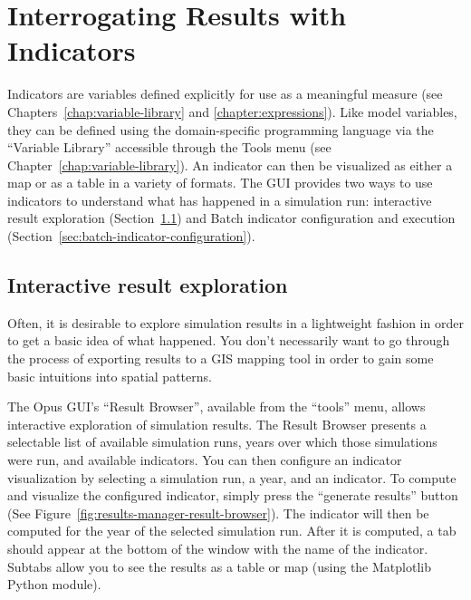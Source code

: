 \section{Interrogating Results with Indicators}
\label{sec:interrogating-results-with-indicators}

Indicators are variables defined explicitly for use as a meaningful
measure (see Chapters~\ref{chap:variable-library} and 
\ref{chapter:expressions}). Like model variables,
they can be defined using the domain-specific programming language via
the ``Variable Library'' accessible through the Tools menu (see
Chapter~\ref{chap:variable-library}). An indicator can then be
visualized as either a map or as a table in a variety of
formats. The GUI provides two ways to use indicators to understand what
has happened in a simulation run: interactive result exploration
(Section~\ref{sec:interactive-result-exploration}) and Batch
indicator configuration and execution
(Section~\ref{sec:batch-indicator-configuration}).

\subsection{Interactive result exploration}
\label{sec:interactive-result-exploration}
Often, it is desirable to explore simulation results in a lightweight
fashion in order to get a basic idea of what happened. You don't
necessarily want to go through the process of exporting results to a
GIS mapping tool in order to gain some basic intuitions into spatial
patterns.

The Opus GUI's ``Result Browser'', available from the ``tools''
menu, allows interactive exploration of simulation results. The Result
Browser presents a selectable list of available simulation runs, years
over which those simulations were run, and available indicators. You
can then configure an indicator visualization by selecting a simulation
run, a year, and an indicator. To compute and visualize the configured
indicator, simply press the ``generate results'' button (See
Figure~\ref{fig:results-manager-result-browser}). The
indicator will then be computed for the year of the selected simulation
run. After it is computed, a tab should appear at the bottom of the
window with the name of the indicator. Subtabs allow you to see the
results as a table or map (using the Matplotlib Python module). 

